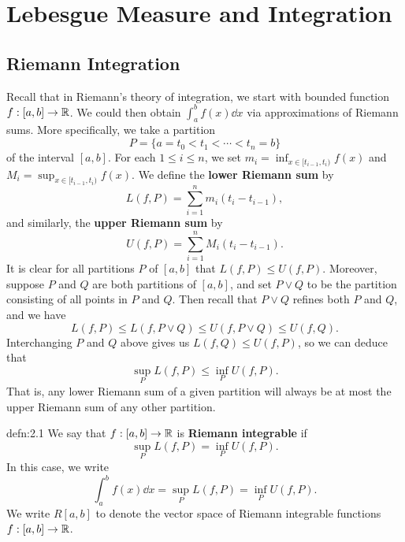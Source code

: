 \section{Lebesgue Measure and Integration}\label{sec:2}

\subsection{Riemann Integration}\label{subsec:2.1}
Recall that in Riemann's theory of integration, we start with bounded function 
$f : [a, b] \to \mathbb{R}$. We could then obtain $\int_a^b f(x)\dd x$ via 
approximations of Riemann sums. More specifically, we take a partition 
\[ P = \{a = t_0 < t_1 < \cdots < t_n = b\} \] 
of the interval $[a, b]$. For each $1 \leq i \leq n$, we set 
$m_i = \inf_{x \in [t_{i-1}, t_i)} f(x)$ and 
$M_i = \sup_{x \in [t_{i-1}, t_i)} f(x)$. We define the {\bf lower 
Riemann sum} by 
\[ L(f, P) = \sum_{i=1}^n m_i(t_i - t_{i-1}), \] 
and similarly, the {\bf upper Riemann sum} by 
\[ U(f, P) = \sum_{i=1}^n M_i(t_i - t_{i-1}). \] 
It is clear for all partitions $P$ of $[a, b]$ that $L(f, P) \leq U(f, P)$. 
Moreover, suppose $P$ and $Q$ are both partitions of $[a, b]$, and set 
$P \vee Q$ to be the partition consisting of all points in $P$ and $Q$. 
Then recall that $P \vee Q$ refines both $P$ and $Q$, and we have 
\[ L(f, P) \leq L(f, P \vee Q) \leq U(f, P \vee Q) \leq U(f, Q). \] 
Interchanging $P$ and $Q$ above gives us $L(f, Q) \leq U(f, P)$, so we can 
deduce that 
\[ \sup_P L(f, P) \leq \inf_P U(f, P). \] 
That is, any lower Riemann sum of a given partition will always be at most 
the upper Riemann sum of any other partition. 

\begin{defn}{defn:2.1}
    We say that $f : [a, b] \to \mathbb{R}$ is {\bf Riemann integrable} if 
    \[ \sup_P L(f, P) = \inf_P U(f, P). \] 
    In this case, we write 
    \[ \int_a^b f(x)\dd x = \sup_P L(f, P) = \inf_P U(f, P). \] 
    We write $R[a, b]$ to denote the vector space of Riemann integrable 
    functions $f : [a, b] \to \mathbb{R}$. 
\end{defn}

